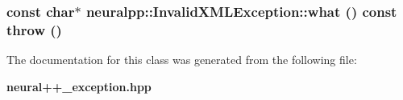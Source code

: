 \subsubsection[what]{\setlength{\rightskip}{0pt plus 5cm}const char$\ast$ neuralpp::InvalidXMLException::what () const  throw ()\hspace{0.3cm}{\tt  [inline]}}\label{classneuralpp_1_1InvalidXMLException_4a8b81678ed0c319e1715ab5ef9112da}




The documentation for this class was generated from the following file:\begin{CompactItemize}
\item 
{\bf neural++\_\-exception.hpp}\end{CompactItemize}
